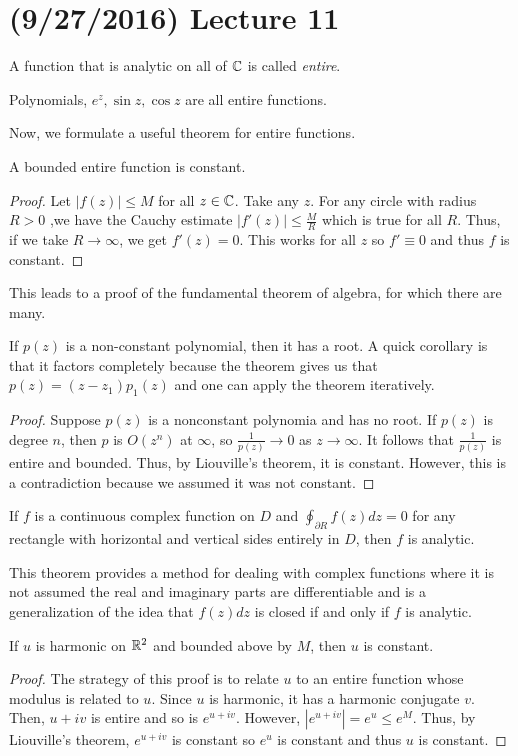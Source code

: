\documentclass[11pt,leqno,oneside]{amsart}
\begin{document}
  \section{(9/27/2016) Lecture 11}
  \begin{defn}
    A function that is analytic on all of ${\mathbb C}$ is called \emph{entire}.
  \end{defn}
  \begin{example}
    Polynomials, $e^z, \sin z, \cos z$ are all entire functions.
  \end{example}
  Now, we formulate a useful theorem for entire functions.
  \begin{thm}
    A bounded entire function is constant.
  \end{thm}
  \begin{proof}
    Let $|f(z)| \leq M$ for all $z \in {\mathbb C}$. Take any $z$. For any
    circle with radius $R >
    0$ ,we have the Cauchy estimate $|f'(z)| \leq \frac{M}{R}$ which
    is true for all $R$. Thus, if we take $R \to \infty$, we get
    $f'(z) = 0$. This works for all $z$ so $f' \equiv 0$ and thus $f$
    is constant.
  \end{proof}
  This leads to a proof of the fundamental theorem of algebra, for
  which there are many.
  \begin{thm}
    If $p(z)$ is a non-constant polynomial, then it has a root. A
    quick corollary is that it factors completely because the theorem
    gives us that $p(z) = (z-z_1)p_1(z)$ and one can apply the theorem iteratively.
  \end{thm}
  \begin{proof}
    Suppose $p(z)$ is a nonconstant polynomia and has no root. If
    $p(z)$ is degree $n$, then $p$ is $O(z^n)$ at $\infty$, so
    $\frac{1}{p(z)} \to 0$ as $z \to \infty$. It follows that
    $\frac{1}{p(z)}$ is entire and bounded. Thus, by Liouville's
    theorem, it is constant. However, this is a contradiction because
    we assumed it was not constant.
  \end{proof}
  \begin{thm}
    If $f$ is a continuous complex function on $D$ and
    $\oint_{\partial R} f(z)dz = 0$ for any rectangle with horizontal
    and vertical sides entirely in $D$, then $f$ is analytic.
  \end{thm}
  This theorem provides a method for dealing with complex functions
  where it is not assumed the real and imaginary parts are
  differentiable and is a generalization of the idea that $f(z)dz$ is
  closed if and only if $f$ is analytic.
  \begin{thm}
    If $u$ is harmonic on ${\mathbb R}^2$ and bounded above by $M$, then $u$ is
    constant.
  \end{thm}
  \begin{proof}
    The strategy of this proof is to relate $u$ to an entire function
    whose modulus is related to $u$. Since $u$ is harmonic, it has a
    harmonic conjugate $v$. Then, $u+iv$ is entire and so is
    $e^{u+iv}$. However, $|e^{u+iv}| = e^u \leq e^M$. Thus, by
    Liouville's theorem, $e^{u+iv}$ is constant so $e^u$ is constant
    and thus $u$ is constant.
  \end{proof}
\end{document}
